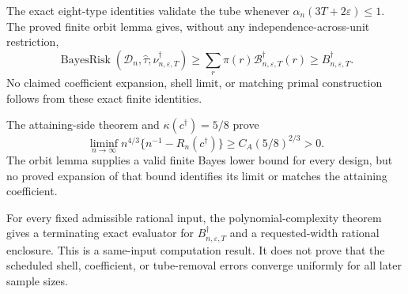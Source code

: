 The exact eight-type identities validate the tube whenever \(\alpha_n(3T+2\varepsilon)\le1\).  The proved finite orbit lemma gives, without any independence-across-unit restriction,
\[
\operatorname{BayesRisk}(\mathcal D_n,\widehat\tau;\nu_{n,\varepsilon,T}^\dagger)
\ge\sum_r\pi(r)\mathcal B_{n,\varepsilon,T}^\dagger(r)
\ge B_{n,\varepsilon,T}^\dagger.
\]
No claimed coefficient expansion, shell limit, or matching primal construction follows from these exact finite identities.

The attaining-side theorem and \(\kappa(c^\dagger)=5/8\) prove
\[
\liminf_{n\to\infty}n^{4/3}\{n^{-1}-R_n(c^\dagger)\}
\ge C_A(5/8)^{2/3}>0.
\]
The orbit lemma supplies a valid finite Bayes lower bound for every design, but no proved expansion of that bound identifies its limit or matches the attaining coefficient.

For every fixed admissible rational input, the polynomial-complexity theorem gives a terminating exact evaluator for \(B_{n,\varepsilon,T}^\dagger\) and a requested-width rational enclosure.  This is a same-input computation result.  It does not prove that the scheduled shell, coefficient, or tube-removal errors converge uniformly for all later sample sizes.
